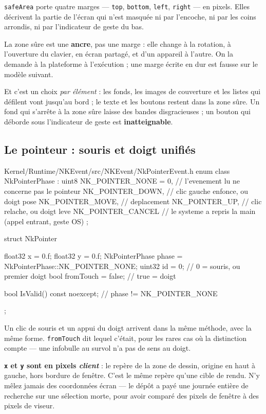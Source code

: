 \texttt{safeArea} porte quatre marges --- \texttt{top}, \texttt{bottom},
\texttt{left}, \texttt{right} --- en pixels. Elles décrivent la partie de l'écran
qui n'est masquée ni par l'encoche, ni par les coins arrondis, ni par
l'indicateur de geste du bas.

\begin{nkretenir}
La zone sûre est une \textbf{ancre}, pas une marge : elle change à la rotation,
à l'ouverture du clavier, en écran partagé, et d'un appareil à l'autre. On la
demande à la plateforme à l'exécution ; une marge écrite en dur est fausse sur le
modèle suivant.

Et c'est un choix \emph{par élément} : les fonds, les images de couverture et les
listes qui défilent vont jusqu'au bord ; le texte et les boutons restent dans la
zone sûre. Un fond qui s'arrête à la zone sûre laisse des bandes disgracieuses ;
un bouton qui déborde sous l'indicateur de geste est \textbf{inatteignable}.
\end{nkretenir}

\subsection{Le pointeur : souris et doigt unifiés}

\begin{nkcode}{Kernel/Runtime/NKEvent/src/NKEvent/NkPointerEvent.h}
enum class NkPointerPhase : uint8 {
    NK_POINTER_NONE = 0,   // l'evenement lu ne concerne pas le pointeur
    NK_POINTER_DOWN,       // clic gauche enfonce, ou doigt pose
    NK_POINTER_MOVE,       // deplacement
    NK_POINTER_UP,         // clic relache, ou doigt leve
    NK_POINTER_CANCEL      // le systeme a repris la main (appel entrant, geste OS)
};

struct NkPointer {
    float32 x = 0.f;
    float32 y = 0.f;
    NkPointerPhase phase = NkPointerPhase::NK_POINTER_NONE;
    uint32 id = 0;            // 0 = souris, ou premier doigt
    bool fromTouch = false;   // true = doigt

    bool IsValid() const noexcept;   // phase != NK_POINTER_NONE
};
\end{nkcode}

Un clic de souris et un appui du doigt arrivent dans la même méthode, avec la
même forme. \texttt{fromTouch} dit lequel c'était, pour les rares cas où la
distinction compte --- une infobulle au survol n'a pas de sens au doigt.

\begin{nkpiege}
\textbf{\texttt{x} et \texttt{y} sont en pixels \emph{client}} : le repère de la
zone de dessin, origine en haut à gauche, hors bordure de fenêtre. C'est le même
repère qu'une cible de rendu. N'y mêlez jamais des coordonnées écran --- le dépôt
a payé une journée entière de recherche sur une sélection morte, pour avoir
comparé des pixels de fenêtre à des pixels de viseur.
\end{nkpiege}

